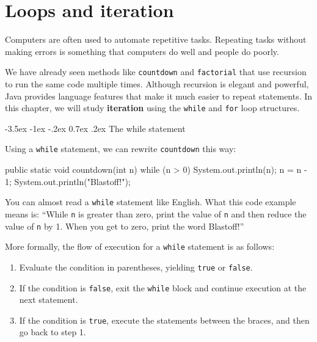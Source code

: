 \documentclass[12pt]{book}
\title{\thetitle}
\author{\theauthors}
\date{\theversion}
\makeatletter
\renewcommand{\section}{\@startsection {section}{1}{\z@}%
    {-3.5ex \@plus -1ex \@minus -.2ex}%
    {0.7ex \@plus.2ex}%
    {\normalfont\Large\bfseries}}
\theoremstyle{exercise}
\newcommand{\java}[1]{\lstinline{#1}} %
\makeatother
\begin{document}
\setcounter{chapter}{6}

\chapter{Loops and iteration}

Computers are often used to automate repetitive tasks.
Repeating tasks without making errors is something that computers do well and people do poorly.


We have already seen methods like {\tt countdown} and {\tt factorial} that use recursion to run the same code multiple times.
Although recursion is elegant and powerful, Java provides language features that make it much easier to repeat statements.
In this chapter, we will study {\bf iteration} using the \java{while} and \java{for} loop structures.


\section{The while statement}


Using a \java{while} statement, we can rewrite {\tt countdown} this way:

\begin{code}
    public static void countdown(int n) {
        while (n > 0) {
            System.out.println(n);
            n = n - 1;
        }
        System.out.println("Blastoff!");
    }
\end{code}

You can almost read a \java{while} statement like English.
What this code example means is: ``While {\tt n} is greater than zero, print the value of {\tt n} and then reduce the value of {\tt n} by 1.
When you get to zero, print the word Blastoff!''

More formally, the flow of execution for a \java{while} statement is as follows:

\begin{enumerate}

\item Evaluate the condition in parentheses, yielding \java{true} or {\tt false}.

\item If the condition is \java{false}, exit the \java{while} block and continue execution at the next statement.

\item If the condition is \java{true}, execute the statements between the braces, and then go back to step 1.

\end{enumerate}
\end{document}
